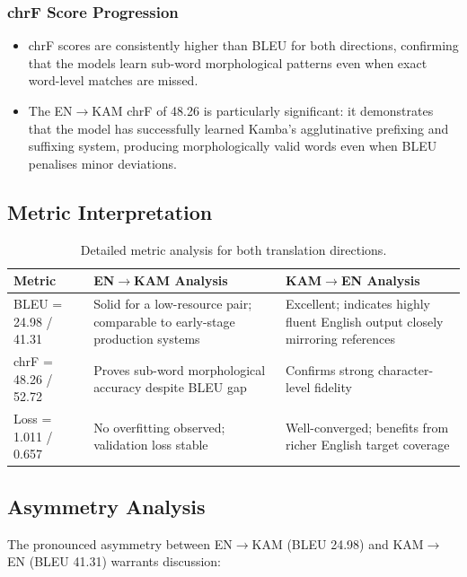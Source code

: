 \documentclass[12pt,a4paper]{article}
\begin{document}
\subsubsection{chrF Score Progression}

\begin{itemize}
    \item chrF scores are consistently higher than BLEU for both directions, confirming that the models learn sub-word morphological patterns even when exact word-level matches are missed.
    \item The EN$\rightarrow$KAM chrF of 48.26 is particularly significant: it demonstrates that the model has successfully learned Kamba's agglutinative prefixing and suffixing system, producing morphologically valid words even when BLEU penalises minor deviations.
\end{itemize}

\subsection{Metric Interpretation}

\begin{table}[H]
\centering
\begin{tabular}{@{}p{3cm}p{5cm}p{5.5cm}@{}}
\toprule
\textbf{Metric} & \textbf{EN$\rightarrow$KAM Analysis} & \textbf{KAM$\rightarrow$EN Analysis} \\
\midrule
BLEU = 24.98 / 41.31 & Solid for a low-resource pair; comparable to early-stage production systems & Excellent; indicates highly fluent English output closely mirroring references \\[6pt]
chrF = 48.26 / 52.72 & Proves sub-word morphological accuracy despite BLEU gap & Confirms strong character-level fidelity \\[6pt]
Loss = 1.011 / 0.657 & No overfitting observed; validation loss stable & Well-converged; benefits from richer English target coverage \\
\bottomrule
\end{tabular}
\caption{Detailed metric analysis for both translation directions.}
\end{table}

\subsection{Asymmetry Analysis}

The pronounced asymmetry between EN$\rightarrow$KAM (BLEU 24.98) and KAM$\rightarrow$EN (BLEU 41.31) warrants discussion:
\end{document}
